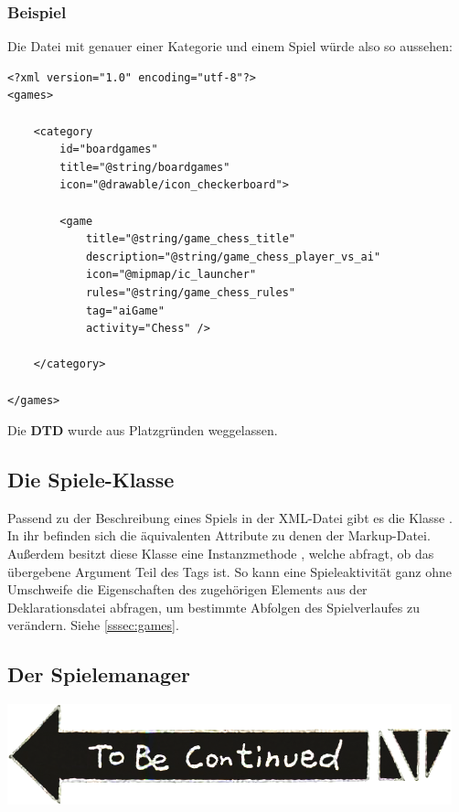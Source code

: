 \subsubsection{Beispiel}

Die Datei mit genauer einer Kategorie und einem Spiel würde also so aussehen:

\begin{lstlisting}
<?xml version="1.0" encoding="utf-8"?>
<games>

    <category
        id="boardgames"
        title="@string/boardgames"
        icon="@drawable/icon_checkerboard">

        <game
            title="@string/game_chess_title"
            description="@string/game_chess_player_vs_ai"
            icon="@mipmap/ic_launcher"
            rules="@string/game_chess_rules"
            tag="aiGame"
            activity="Chess" />

    </category>

</games>
\end{lstlisting}

Die \textbf{DTD} wurde aus Platzgründen weggelassen.

\subsection{Die Spiele-Klasse}

Passend zu der Beschreibung eines Spiels in der XML-Datei gibt es die Klasse
. In ihr befinden sich die äquivalenten Attribute zu denen der
Markup-Datei. Außerdem besitzt diese Klasse eine Instanzmethode , welche abfragt, ob das übergebene Argument Teil des
Tags ist. So kann eine Spieleaktivität ganz ohne Umschweife die Eigenschaften
des zugehörigen Elements aus der Deklarationsdatei abfragen, um bestimmte
Abfolgen des Spielverlaufes zu verändern. Siehe \autoref{sssec:games}.

\subsection{Der Spielemanager}

\includegraphics{resources/tobecontinued}

